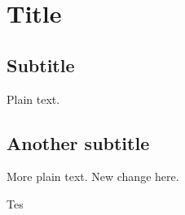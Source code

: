 \documentclass{article}
\begin{document}


\section{Title}

\subsection{Subtitle}

Plain text.

\subsection{Another subtitle}

More plain text. New change here.



Tes
\end{document}
